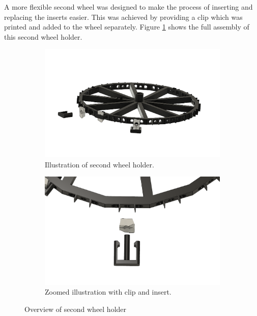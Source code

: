 		A more flexible second wheel was designed to make the process of inserting and replacing the inserts easier. This was achieved by providing a clip which was printed and added to the wheel separately. Figure \ref{fig:setup:wheelholder2:inserts} shows the full assembly of this second wheel holder. 
		
		
		\begin{figure}[hbtp]
		\centering
		\begin{subfigure}{0.49\textwidth}
			\includegraphics[width=\linewidth]{fig/Camera_setup/Tool_Holder/Wheel_Holder/Second_Wheel_Holder/radhouder_v2_assembly v3 extra insert.png}
			\caption{Illustration of second wheel holder.}
			\label{fig:setup:wheelholder2:inserts}
		\end{subfigure}
		\hspace*{\fill}
		\begin{subfigure}{0.49\textwidth}
			\includegraphics[width=\linewidth]{fig/Camera_setup/Tool_Holder/Wheel_Holder/Second_Wheel_Holder/radhouder_v2_assembly v3 top view insert.png}
			\caption{Zoomed illustration with clip and insert.}
			\label{fig:setup:wheelholder2:topinserts}
		\end{subfigure}
		\caption{Overview of second wheel holder}
		\end{figure}
		
